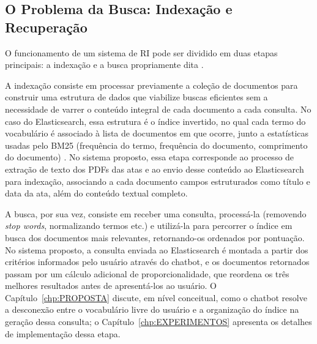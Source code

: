 \subsection{O Problema da Busca: Indexação e Recuperação}\label{sec:problema-busca}

O funcionamento de um sistema de RI pode ser dividido em duas etapas principais: a indexação e a busca propriamente dita \cite{manning2008ir}.

A indexação consiste em processar previamente a coleção de documentos para construir uma estrutura de dados que viabilize buscas eficientes sem a necessidade de varrer o conteúdo integral de cada documento a cada consulta. No caso do Elasticsearch, essa estrutura é o índice invertido, no qual cada termo do vocabulário é associado à lista de documentos em que ocorre, junto a estatísticas usadas pelo BM25 (frequência do termo, frequência do documento, comprimento do documento) \cite{IBMElasticsearch}. No sistema proposto, essa etapa corresponde ao processo de extração de texto dos PDFs das atas e ao envio desse conteúdo ao Elasticsearch para indexação, associando a cada documento campos estruturados como título e data da ata, além do conteúdo textual completo.

A busca, por sua vez, consiste em receber uma consulta, processá-la (removendo \textit{stop words}, normalizando termos etc.) e utilizá-la para percorrer o índice em busca dos documentos mais relevantes, retornando-os ordenados por pontuação. No sistema proposto, a consulta enviada ao Elasticsearch é montada a partir dos critérios informados pelo usuário através do chatbot, e os documentos retornados passam por um cálculo adicional de proporcionalidade, que reordena os três melhores resultados antes de apresentá-los ao usuário. O Capítulo~\ref{chp:PROPOSTA} discute, em nível conceitual, como o chatbot resolve a desconexão entre o vocabulário livre do usuário e a organização do índice na geração dessa consulta; o Capítulo~\ref{chp:EXPERIMENTOS} apresenta os detalhes de implementação dessa etapa.
